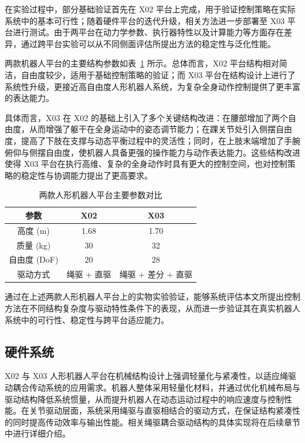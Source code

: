 在实验过程中，部分基础验证首先在 X02 平台上完成，用于验证控制策略在实际系统中的基本可行性；随着硬件平台的迭代升级，相关方法进一步部署至 X03 平台进行测试。由于两平台在动力学参数、执行器特性以及计算能力等方面存在差异，通过跨平台实验可以从不同侧面评估所提出方法的稳定性与泛化性能。

两款机器人平台的主要结构参数如表~\ref{tab:robot_platform} 所示。总体而言，X02 平台结构相对简洁，自由度较少，适用于基础控制策略的验证；而 X03 平台在结构设计上进行了系统性升级，更接近高自由度人形机器人系统，为复杂全身动作控制提供了更丰富的表达能力。

具体而言，X03 在 X02 的基础上引入了多个关键结构改进：在腰部增加了两个自由度，从而增强了躯干在全身运动中的姿态调节能力；在踝关节处引入侧摆自由度，提高了下肢在支撑与动态平衡过程中的灵活性；同时，在上肢末端增加了手腕俯仰与侧摆自由度，使机器人具备更强的操作能力与动作表达能力。这些结构改进使得 X03 平台在执行高维、复杂的全身动作时具有更大的控制空间，也对控制策略的稳定性与协调能力提出了更高要求。

\begin{table}[htbp]
	\centering
	\caption{两款人形机器人平台主要参数对比}
	\label{tab:robot_platform}
	\begin{tabular}{ccc}
		\toprule
		参数 & X02 & X03 \\
		\midrule
		高度 (m) & 1.68 & 1.70 \\
		质量 (kg) & 30 & 32 \\
		自由度 (DoF) & 20 & 28 \\
		驱动方式 & 绳驱 + 直驱 & 绳驱 + 差分 + 直驱 \\
		\bottomrule
	\end{tabular}
\end{table}

通过在上述两款人形机器人平台上的实物实验验证，能够系统评估本文所提出控制方法在不同结构复杂度与驱动特性条件下的表现，从而进一步验证其在真实机器人系统中的可行性、稳定性与跨平台适应能力。
 

\subsection{硬件系统}
X02 与 X03 人形机器人平台在机械结构设计上强调轻量化与紧凑性，以适应绳驱动耦合传动系统的应用需求。机器人整体采用轻量化材料，并通过优化机械布局与驱动结构降低系统惯量，从而提升机器人在动态运动过程中的响应速度与控制性能。在关节驱动层面，系统采用绳驱与直驱相结合的驱动方式，在保证结构紧凑性的同时提高传动效率与输出性能。相关绳驱耦合驱动结构的具体实现将在后续章节中进行详细介绍。

